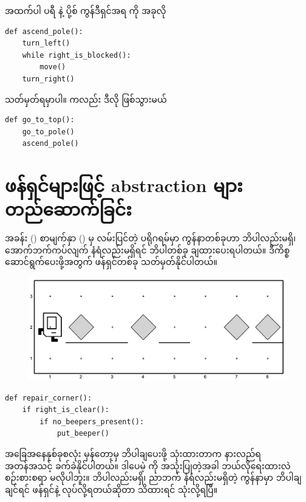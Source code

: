 အထက်ပါ ပရီ နဲ့ ပို့စ် ကွန်ဒီရှင်အရ  ကို အခုလို 
%
\setlength{\fboxsep}{0pt}
\begin{verbatim}
def ascend_pole():
    turn_left()
    while right_is_blocked():
        move()
    turn_right()
\end{verbatim}
%
သတ်မှတ်ရမှာပါ။  ကလည်း ဒီလို ဖြစ်သွားမယ်
%
\setlength{\fboxsep}{0pt}
\begin{verbatim}
def go_to_top():
    go_to_pole()
    ascend_pole()
\end{verbatim}
%

\section{ဖန်ရှင်များဖြင့် abstraction များ တည်ဆောက်ခြင်း}
အခန်း (\fRefNo{\ref{ch:ch02}}) စာမျက်နှာ (\fRefNo{\pageref{lst:repair_street}}) မှ လမ်းပြင်တဲ့ ပရိုဂရမ်မှာ ကွန်နာတစ်ခုဟာ ဘိပါလည်းမရှိ၊ အောက်ဘက်ကပ်လျက် နံရံလည်းမရှိရင်  ဘိပါတစ်ခု ချထားပေးရပါတယ်။ ဒီကိစ္စ ဆောင်ရွက်ပေးဖို့အတွက် ဖန်ရှင်တစ်ခု သတ်မှတ်နိုင်ပါတယ်။ 
%
\begin{figure}[htb!]
    {\includegraphics[width=0.5\linewidth]{images/ch02/st_repair/init.jpg}}
    \caption{}
\end{figure}
%
%
\setlength{\fboxsep}{0pt}
\begin{verbatim}
def repair_corner():
    if right_is_clear():
        if no_beepers_present():
            put_beeper()
\end{verbatim}
%
အခြေအနေနှစ်ခုစလုံး မှန်တော့မှ ဘိပါချပေးဖို့    သုံးထားတာက နားလည်ရ အတန်အသင့် ခက်ခဲနိုင်ပါတယ်။  ဒါပေမဲ့  ကို အသုံးပြုတဲ့အခါ ဘယ်လိုရေးထားလဲ စဉ်းစားစရာ မလိုပါဘူး။ ဘိပါလည်းမရှိ၊ ညာဘက် နံရံလည်းမရှိတဲ့ ကွန်နာမှာ ဘိပါချချင်ရင်  ဖန်ရှင်နဲ့ လုပ်လို့ရတယ်ဆိုတာ သိထားရင် သုံးလို့ရပြီ။

